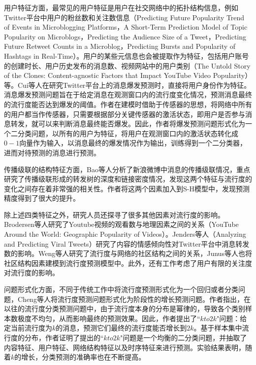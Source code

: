用户特征方面，最常见的用户特征是用户在社交网络中的拓扑结构信息，例如Twitter平台中用户的粉丝数和关注数信息\citep{chen2005zhulu}（Predicting Future Popularity Trend of Events in Microblogging Platforms，A Short-Term Prediction Model of Topic Popularity
on Microblogs，Predicting the Audience Size of a Tweet，Predicting Future Retweet Counts in a Microblog，Predicting Bursts and Popularity of Hashtags in Real-Time）。用户的某些元信息也会被提取作为特征，包括用户账号的创建时长、用户历史发布的消息数\citep{chen2005zhulu}、视频网站中的用户类别\citep{chen2005zhulu}（The Untold Story of the Clones: Content-agnostic Factors
that Impact YouTube Video Popularity）等。Cui等人\citep{chen2005zhulu}在研究Twitter平台上的消息爆发预测时，直接将用户身份作为特征。消息爆发预测问题旨在于给定消息在观测窗口内的流行度变化情况，预测消息最终的流行度能否达到爆发的阈值。作者在建模时借助于传感器的思想，将网络中所有的用户都当作传感器，只需要根据部分关键传感器的激活状态，即用户是否参与消息转发，就可以来判断消息最终能否爆发。因此，作者将爆发预测问题形式化为一个二分类问题，以所有的用户为特征，将用户在观测窗口内的激活状态转化成$0-1$向量作为输入，以消息最终的爆发情况作为输出，训练得到一个二分类器，进而对待预测的消息进行预测。

传播级联的结构特征方面，Bao等人\citep{chen2005zhulu}分析了新浪微博中消息的传播级联情况，重点研究了传播级联形成的转发树的深度和链接密度情况，发现这两个特征与流行度的变化之间存在着非常强的相关性。作者将这两个因素加入到S-H模型中，发现预测精度得到了很大的提升。

除上述四类特征之外，研究人员还探寻了很多其他因素对流行度的影响。Brodersen等人\citep{chen2005zhulu}研究了Youtube视频的观看数与地理因素之间的关系（YouTube Around the World: Geographic Popularity of Videos）。Jenders等人\citep{chen2005zhulu}（Analyzing and Predicting Viral Tweets）研究了内容的情感倾向性对Twitter平台中消息转发数的影响。Weng等人\citep{chen2005zhulu}研究了流行度与网络的社区结构之间的关系，Junus等人\citep{chen2005zhulu}也将社区结构因素建模到流行度预测模型中。此外，还有工作考虑了用户有限的关注度对流行度的影响\citep{chen2005zhulu}。

问题形式化方面，不同于传统工作中将流行度预测形式化为一个回归或者分类问题，Cheng等人\citep{chen2005zhulu}将流行度预测问题形式化为阶段性的增长预测问题。作者指出，在以往的流行度分类预测问题中，由于流行度本身的分布是幂律的，导致各个类别样本数极度不均匀，从而影响最终的预测效果。因此，作者提出了``$kto2k$"问题：给定当前流行度为$k$的消息，预测它们最终的流行度能否增长到$2k$。基于样本集中流行度的分布，作者证明了提出的``$kto2k$"问题是一个均衡的二分类问题，并抽取了内容特征、用户特征、网络结构特征以及时序特征来进行预测。实验结果表明，随着$k$的增长，分类预测的准确率也在不断提高。

